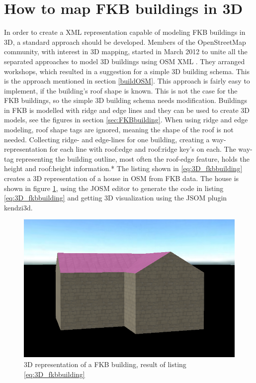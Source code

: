 \section{How to map FKB buildings in 3D}
In order to create a XML representation capable of modeling FKB buildings in 3D, a standard approach should be developed. Members of the OpenStreetMap community, with interest in 3D mapping, started in March 2012 to unite all the separated approaches to model 3D buildings using OSM XML \cite{OpenStreetMapm}. They arranged workshops, which resulted in a suggestion for a simple 3D building schema. This is the approach mentioned in section \ref{buildOSM}. This approach is fairly easy to implement, if the building's roof shape is known. This is not the case for the FKB buildings, so the simple 3D building schema needs modification. Buildings in FKB is modelled with ridge and edge lines and they can be used to create 3D models, see the figures in section \ref{sec:FKBbuilding}. When using ridge and edge modeling, roof shape tags are ignored, meaning the shape of the roof is not needed. Collecting ridge- and edge-lines for one building, creating a way-representation for each line with roof:edge and roof:ridge key's on each. The way-tag representing the building outline, most often the roof-edge feature, holds the height and roof:height information.*%
 The listing shown in \ref{eq:3D_fkbbuilding} creates a 3D representation of a house in OSM from FKB data. The house is shown in figure \ref{fig:3DFKBbuild}, using the JOSM editor to generate the code in listing \ref{eq:3D_fkbbuilding} and getting 3D visualization using the JSOM plugin kendzi3d. 

\begin{figure}[H]
    \centering
    \includegraphics[scale=0.5]{figures/FixedByMe/3DFKBbuilding.png}
    \caption{3D representation of a FKB building, result of listing \ref{eq:3D_fkbbuilding}}
    \label{fig:3DFKBbuild}
\end{figure}

